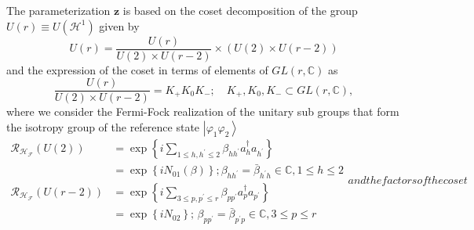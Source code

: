 \documentclass[aps,preprint]{revtex4}%
\begin{document}
The parameterization $\mathbf{z}$ is based on the coset decomposition of the
group $U\left(  r\right)  \equiv U\left(  \mathcal{H}^{1}\right)  $ given by
\begin{equation}
U\left(  r\right)  =\frac{U\left(  r\right)  }{U\left(  2\right)  \times
U\left(  r-2\right)  }\times\left(  U\left(  2\right)  \times U\left(
r-2\right)  \right)
\end{equation}
and the expression of the coset in terms of elements of $GL\left(
r,\mathbb{C}\right)  $ as
\begin{equation}
\frac{U\left(  r\right)  }{U\left(  2\right)  \times U\left(  r-2\right)
}=K_{+}K_{0}K_{-};\quad K_{+},K_{0},K_{-}\subset GL\left(  r,\mathbb{C}%
\right)  ,
\end{equation}
where we consider the Fermi-Fock realization of the unitary sub groups that
form the isotropy group of the reference state $\left\vert \varphi_{1}%
\varphi_{2}\right\rangle $
\begin{subequations}
\begin{align}
\mathcal{R}_{\mathcal{H}_{\mathcal{F}}}\left(  U\left(  2\right)  \right)   &
=\exp\left\{  i\sum\limits_{1\leq h,h^{\prime}\leq2}\beta_{hh^{\prime}}%
a_{h}^{\dagger}a_{h^{\prime}}\right\} \nonumber\\
&  =\exp\left\{  iN_{01}\left(  \beta\right)  \right\}  ;\beta_{hh^{\prime}%
}=\bar{\beta}_{h^{\prime}h}\in\mathbb{C},1\leq h\leq2\\
\mathcal{R}_{\mathcal{H}_{\mathcal{F}}}\left(  U\left(  r-2\right)  \right)
&  =\exp\left\{  i\sum\limits_{3\leq p,p^{\prime}\leq r}\beta_{pp^{\prime}%
}a_{p}^{\dagger}a_{p^{\prime}}\right\} \nonumber\\
&  =\exp\left\{  iN_{02}\right\}  ;\,\beta_{pp^{\prime}}=\bar{\beta
}_{p^{\prime}p}\in\mathbb{C},3\leq p\leq r
\end{align}
and the factors of the coset%
\end{subequations}
\end{document}
